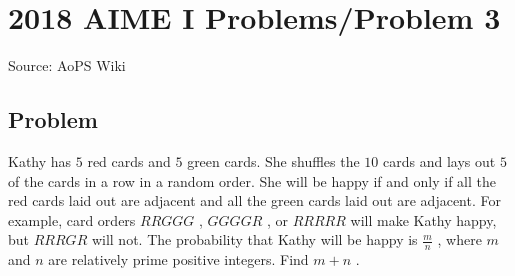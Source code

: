 \documentclass[12pt]{article}
\begin{document}
\section*{{2018 AIME I Problems/Problem 3}}
Source: AoPS Wiki

\subsection*{Problem}
Kathy has $5$ red cards and $5$ green cards. She shuffles the $10$ cards and lays out $5$ of the cards in a row in a random order. She will be happy if and only if all the red cards laid out are adjacent and all the green cards laid out are adjacent. For example, card orders $RRGGG$ , $GGGGR$ , or $RRRRR$ will make Kathy happy, but $RRRGR$ will not. The probability that Kathy will be happy is $\frac{m}{n}$ , where $m$ and $n$ are relatively prime positive integers. Find $m + n$ .
\end{document}
